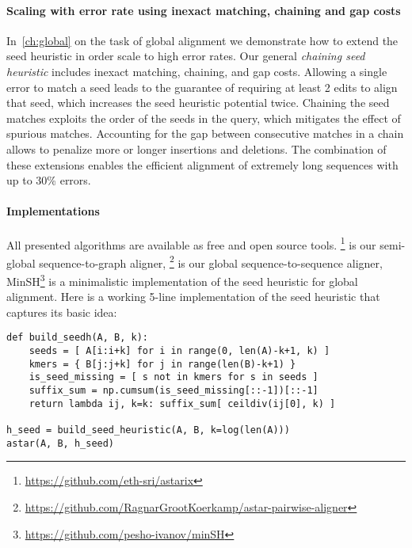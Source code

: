 \paragraph{Scaling with error rate using inexact matching, chaining and gap costs}
In~\cref{ch:global} on the task of global alignment we demonstrate how to extend
the seed heuristic in order scale to high error rates. Our general
\emph{chaining seed heuristic} includes inexact matching, chaining, and gap
costs. Allowing a single error to match a seed leads to the guarantee of
requiring at least 2 edits to align that seed, which increases the seed
heuristic potential twice. Chaining the seed matches exploits the order of the
seeds in the query, which mitigates the effect of spurious matches. Accounting
for the gap between consecutive matches in a chain allows to penalize more or
longer insertions and deletions. The combination of these extensions enables the
efficient alignment of extremely long sequences with up to 30\% errors. 

\paragraph{Implementations}
All presented algorithms are available as free and open source tools.
\astarix\footnote{\url{https://github.com/eth-sri/astarix}} is our semi-global
sequence-to-graph aligner,
\astarpa\footnote{\url{https://github.com/RagnarGrootKoerkamp/astar-pairwise-aligner}}
is our global sequence-to-sequence aligner,
MinSH\footnote{\url{https://github.com/pesho-ivanov/minSH}} is a minimalistic
implementation of the seed heuristic for global alignment. Here is a working
5-line implementation of the seed heuristic that captures its basic idea:

\begin{samepage}
\begin{verbatim}
def build_seedh(A, B, k):
    seeds = [ A[i:i+k] for i in range(0, len(A)-k+1, k) ]
    kmers = { B[j:j+k] for j in range(len(B)-k+1) }
    is_seed_missing = [ s not in kmers for s in seeds ]
    suffix_sum = np.cumsum(is_seed_missing[::-1])[::-1]
    return lambda ij, k=k: suffix_sum[ ceildiv(ij[0], k) ]

h_seed = build_seed_heuristic(A, B, k=log(len(A)))
astar(A, B, h_seed)
\end{verbatim}
\end{samepage}